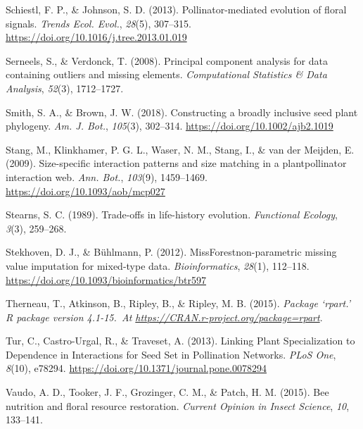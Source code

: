 \documentclass[
  12pt,
  a4paper,
]{article}
\newlength{\cslhangindent}
\newlength{\cslentryspacingunit} %
\newenvironment{CSLReferences}[2] %
 {%
  \setlength{\parindent}{0pt}
  \ifodd #1
  \let\oldpar\par
  \def\par{\hangindent=\cslhangindent\oldpar}
  \fi
  \setlength{\parskip}{#2\cslentryspacingunit}
 }%
 {}
\begin{document}
\begin{CSLReferences}{1}{0}
\leavevmode{}%
Schiestl, F. P., \& Johnson, S. D. (2013). Pollinator-mediated evolution of floral signals. \emph{Trends Ecol. Evol.}, \emph{28}(5), 307--315. \url{https://doi.org/10.1016/j.tree.2013.01.019}

\leavevmode{}%
Serneels, S., \& Verdonck, T. (2008). Principal component analysis for data containing outliers and missing elements. \emph{Computational Statistics \& Data Analysis}, \emph{52}(3), 1712--1727.

\leavevmode{}%
Smith, S. A., \& Brown, J. W. (2018). Constructing a broadly inclusive seed plant phylogeny. \emph{Am. J. Bot.}, \emph{105}(3), 302--314. \url{https://doi.org/10.1002/ajb2.1019}

\leavevmode{}%
Stang, M., Klinkhamer, P. G. L., Waser, N. M., Stang, I., \& van der Meijden, E. (2009). Size-specific interaction patterns and size matching in a plant\textendash pollinator interaction web. \emph{Ann. Bot.}, \emph{103}(9), 1459--1469. \url{https://doi.org/10.1093/aob/mcp027}

\leavevmode{}%
Stearns, S. C. (1989). Trade-offs in life-history evolution. \emph{Functional Ecology}, \emph{3}(3), 259--268.

\leavevmode{}%
Stekhoven, D. J., \& Bühlmann, P. (2012). {MissForest}\textemdash non-parametric missing value imputation for mixed-type data. \emph{Bioinformatics}, \emph{28}(1), 112--118. \url{https://doi.org/10.1093/bioinformatics/btr597}

\leavevmode{}%
Therneau, T., Atkinson, B., Ripley, B., \& Ripley, M. B. (2015). \emph{Package {`rpart.'} R package version 4.1-15.~At \href{https://CRAN.R-project.org/package=rpart}{https://CRAN.r-project.org/package=rpart}}.

\leavevmode{}%
Tur, C., Castro-Urgal, R., \& Traveset, A. (2013). Linking {Plant Specialization} to {Dependence} in {Interactions} for {Seed Set} in {Pollination Networks}. \emph{PLoS One}, \emph{8}(10), e78294. \url{https://doi.org/10.1371/journal.pone.0078294}

\leavevmode{}%
Vaudo, A. D., Tooker, J. F., Grozinger, C. M., \& Patch, H. M. (2015). Bee nutrition and floral resource restoration. \emph{Current Opinion in Insect Science}, \emph{10}, 133--141.


\end{CSLReferences}
\end{document}
